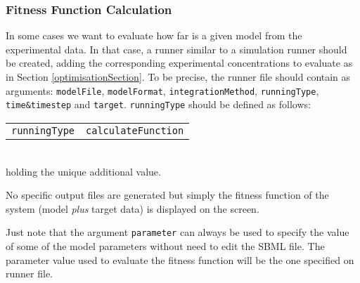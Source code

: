 \documentclass[a4paper, 11pt]{article}
\begin{document}
\subsubsection{Fitness Function Calculation}
In some cases we want to evaluate how far is a given model from the experimental data.
In that case, a runner similar to a simulation runner should be created, adding the corresponding experimental concentrations to evaluate as in Section \ref{optimisationSection}.
To be precise, the runner file should contain as arguments: \texttt{modelFile}, \texttt{modelFormat}, \texttt{integrationMethod}, \texttt{runningType}, \texttt{time\&timestep} and \texttt{target}. 
\texttt{runningType} should be defined as follows:\\[1.5ex]
\begin{tabular}{cc}\texttt{runningType}&\texttt{calculateFunction}\end{tabular}\\[1.5ex]
holding the unique additional value.

No specific output files are generated but simply the fitness function of the system (model \emph{plus} target data) is displayed on the screen.

Just note that the argument \texttt{parameter} can always be used to specify the value of some of the model parameters without need to edit the SBML file.
The parameter value used to evaluate the fitness function will be the one specified on runner file.
\end{document}
